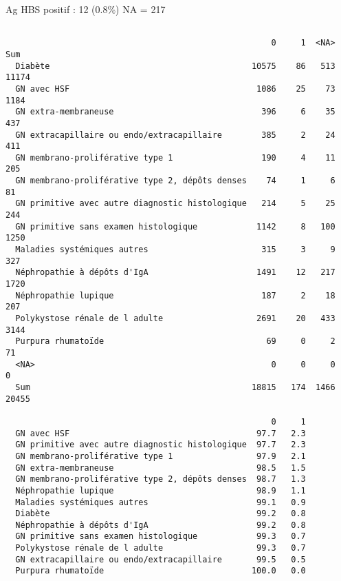 \documentclass[11pt,a4paper]{article}\usepackage[]{graphicx}\usepackage[]{color}
\makeatletter
\newenvironment{kframe}{%
 \def\at@end@of@kframe{}%
 \ifinner\ifhmode%
  \def\at@end@of@kframe{\end{minipage}}%
  \begin{minipage}{\columnwidth}%
 \fi\fi%
 \def\FrameCommand##1{\hskip\@totalleftmargin \hskip-\fboxsep
 \colorbox{shadecolor}{##1}\hskip-\fboxsep
     \hskip-\linewidth \hskip-\@totalleftmargin \hskip\columnwidth}%
 \MakeFramed {\advance\hsize-\width
   \@totalleftmargin\z@ \linewidth\hsize
   \@setminipage}}%
 {\par\unskip\endMakeFramed%
 \at@end@of@kframe}
\newenvironment{knitrout}{}{} %
\makeatother
\begin{document}
Ag HBS positif : 12 (0.8\%) NA = 217

\begin{knitrout}
\color{fgcolor}\begin{kframe}
\begin{verbatim}
                                                 
                                                      0     1  <NA>   Sum
  Diabète                                         10575    86   513 11174
  GN avec HSF                                      1086    25    73  1184
  GN extra-membraneuse                              396     6    35   437
  GN extracapillaire ou endo/extracapillaire        385     2    24   411
  GN membrano-proliférative type 1                  190     4    11   205
  GN membrano-proliférative type 2, dépôts denses    74     1     6    81
  GN primitive avec autre diagnostic histologique   214     5    25   244
  GN primitive sans examen histologique            1142     8   100  1250
  Maladies systémiques autres                       315     3     9   327
  Néphropathie à dépôts d'IgA                      1491    12   217  1720
  Néphropathie lupique                              187     2    18   207
  Polykystose rénale de l adulte                   2691    20   433  3144
  Purpura rhumatoïde                                 69     0     2    71
  <NA>                                                0     0     0     0
  Sum                                             18815   174  1466 20455
                                                 
                                                      0     1
  GN avec HSF                                      97.7   2.3
  GN primitive avec autre diagnostic histologique  97.7   2.3
  GN membrano-proliférative type 1                 97.9   2.1
  GN extra-membraneuse                             98.5   1.5
  GN membrano-proliférative type 2, dépôts denses  98.7   1.3
  Néphropathie lupique                             98.9   1.1
  Maladies systémiques autres                      99.1   0.9
  Diabète                                          99.2   0.8
  Néphropathie à dépôts d'IgA                      99.2   0.8
  GN primitive sans examen histologique            99.3   0.7
  Polykystose rénale de l adulte                   99.3   0.7
  GN extracapillaire ou endo/extracapillaire       99.5   0.5
  Purpura rhumatoïde                              100.0   0.0
\end{verbatim}
\end{kframe}
\end{knitrout}
~\\
\end{document}
